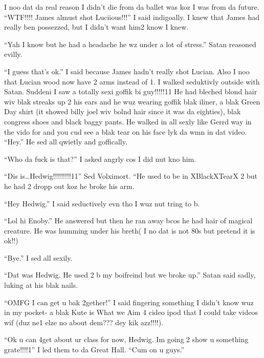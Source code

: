 I noo dat da real reason I didn't die from da ballet was koz I was from da future. \enquote{WTF!!!! James almust shot Luciious!!!} I said indigoally. I knew that James had really ben possezzed, but I didn't want him2 know I knew.

\enquote{Yah I know but he had a headache he wz under a lot of stress.} Satan reasoned evilly.

\enquote{I guess that's ok.} I said because James hadn't really shot Lucian. Also I noo that Lucian wood now have 2 arms instead of 1. I walked seduktivly outside with Satan. Suddeni I saw a totally sexi goffik bi guy!!!!!11 He had bleched blond hair wiv blak streaks up 2 his ears and he wuz wearing goffik blak iliner, a blak Green Day shirt (it showed billy joel wiv bolnd hair since it was da eighties), blak congress shoes and black baggy pants. He walked in all sexly like Gerrd way in the vido for  and you cud see a blak tear on his face lyk da wmn in dat video. \enquote{Hey.} He sed all qwietly and goffically.

\enquote{Who da fuck is that?} I asked angrly cos I did nut kno him.

\enquote{Dis is…Hedwig!!!!!!!!!11} Sed Volximort. ``He used to be in XBlackXTearX 2 but he had 2 dropp out koz he broke his arm.

\enquote{Hey Hedwig.} I said seductively evn tho I wuz nut tring to b.

\enquote{Lol hi Enoby.} He answered but then he ran away bcos he had hair of magical creature. He was humming  under his breth( I no dat is not 80s but pretend it is ok!!)

\enquote{Bye.} I sed all sexily.

\enquote{Dat was Hedwig. He used 2 b my boifreind but we broke up.} Satan said sadly, luking at his blak nails.

\enquote{OMFG I can get u bak 2gether!} I said fingering something I didn't know wuz in my pocket- a blak Kute is What we Aim 4 cideo ipod that I could take videos wif (duz ne1 elze no about dem??? dey kik azz!!!!).

\enquote{Ok u can 4get about ur class for now, Hedwig. Im going 2 show u something grate!!!!1} I led them to da Great Hall. \enquote{Cum on u guys.}

